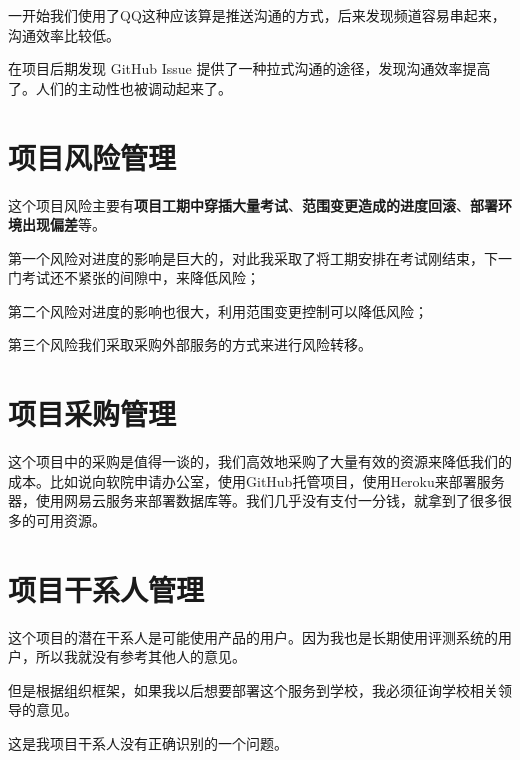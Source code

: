 一开始我们使用了QQ这种应该算是推送沟通的方式，后来发现频道容易串起来，沟通效率比较低。

在项目后期发现 GitHub Issue 提供了一种拉式沟通的途径，发现沟通效率提高了。人们的主动性也被调动起来了。

\section{项目风险管理}

这个项目风险主要有\textbf{项目工期中穿插大量考试}、\textbf{范围变更造成的进度回滚}、\textbf{部署环境出现偏差}等。

第一个风险对进度的影响是巨大的，对此我采取了将工期安排在考试刚结束，下一门考试还不紧张的间隙中，来降低风险；

第二个风险对进度的影响也很大，利用范围变更控制可以降低风险；

第三个风险我们采取采购外部服务的方式来进行风险转移。

\section{项目采购管理}

这个项目中的采购是值得一谈的，我们高效地采购了大量有效的资源来降低我们的成本。比如说向软院申请办公室，使用GitHub托管项目，使用Heroku来部署服务器，使用网易云服务来部署数据库等。我们几乎没有支付一分钱，就拿到了很多很多的可用资源。

\section{项目干系人管理}

这个项目的潜在干系人是可能使用产品的用户。因为我也是长期使用评测系统的用户，所以我就没有参考其他人的意见。

但是根据组织框架，如果我以后想要部署这个服务到学校，我必须征询学校相关领导的意见。

这是我项目干系人没有正确识别的一个问题。
